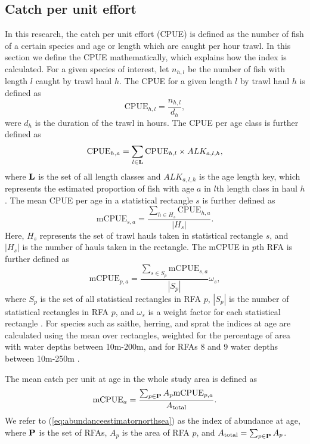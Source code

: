 \documentclass[a4paper 12pt]{article}
\numberwithin{equation}{section}
\begin{document}
\subsection{Catch per unit effort}
\label{sec:cpueestimators}
In this research, the catch per unit effort (CPUE) is defined as the number of fish of a certain species and age or length which are caught per hour trawl. In this section we define the CPUE mathematically, which explains how the index is calculated. For a given species of interest, let $n_{h,l}$ be the number of fish with length $l$ caught by trawl haul $h$. The CPUE for a given length $l$ by trawl haul $h$ is defined as 
\begin{equation}\label{eq:cpueHaul}
\mathrm{CPUE}_{h,l} =\frac{n_{h,l}}{d_h},
\end{equation}
were $d_h$ is the duration of the trawl in hours. The CPUE per age class is further defined as
\begin{equation}\label{eq:cpueALK}
\mathrm{CPUE}_{h,a} =\sum_{l \in {\bf L}}\mathrm{CPUE}_{h, l} \times ALK_{a,l,h},
\end{equation}
where ${\bf L}$ is the set of all length classes and $ALK_{a,l,h}$ is the age length key, which represents the estimated proportion of fish with age $a$ in $l$th length class in haul $h$. The mean CPUE per age in a statistical rectangle $s$ is further defined as
\begin{equation}\label{eq:cpueRec}
\mathrm{mCPUE}_{s,a} =\frac{\sum_{h \in H_{s}} \mathrm{CPUE}_{h,a}}{|H_{s}|}.
\end{equation}
Here, $H_{s}$ represents the set of trawl hauls taken in statistical rectangle $s$, and $|H_{s}|$ is the number of hauls taken in the rectangle. The mCPUE in $p$th RFA is further defined as
\begin{equation}\label{eq:cpueRFA}
\mathrm{mCPUE}_{p,a} = \frac{ \sum_{s \in S_{p}} \mathrm{mCPUE}_{s,a}}{|S_{p}|} \omega_s,
\end{equation}
where $S_{p}$ is the set of all statistical rectangles in RFA $p$, $|S_{p}|$ is the number of statistical rectangles in RFA $p$, and $\omega_s$ is a weight factor for each statistical rectangle \citep{ICES2013}. For species such as saithe, herring, and sprat the indices at age are calculated using the mean over rectangles, weighted for the percentage of area with water depths between 10m-200m, and for RFAs 8 and 9 water depths between 10m-250m \citep{ICES2013}.

 The mean catch per unit at age in the whole study area is defined as
\begin{equation}
\text{mCPUE}_a= \frac{\sum_{p\in {\bf P}} A_{p}  \mathrm{mCPUE}_{p,a}}{A_{\text{total}}}.
\label{eq:abundanceestimatornorthsea}
\end{equation}
We refer to (\ref{eq:abundanceestimatornorthsea}) as the index of abundance at age, where ${\bf P}$ is the set of RFAs, $A_p$ is the area of RFA $p$, and $A_{\text{total}} = \sum_{p\in {\bf P}} A_{p}$.
\end{document}

